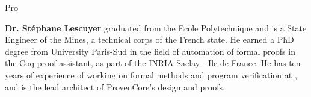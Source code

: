 \begin{sitedescription}{Pro}
\begin{compactitem}
\item {\bf Dr. Stéphane Lescuyer} graduated from the Ecole
  Polytechnique and is a State Engineer of the Mines, a technical
  corps of the French state. He earned a PhD degree from University
  Paris-Sud in the field of automation of formal proofs in the Coq
  proof assistant, as part of the INRIA Saclay - Ile-de-France. He
  has ten years of experience of working on formal methods and
  program verification at \provenrun, and is the lead architect
  of ProvenCore's design and proofs.
\end{compactitem}

\end{sitedescription}

